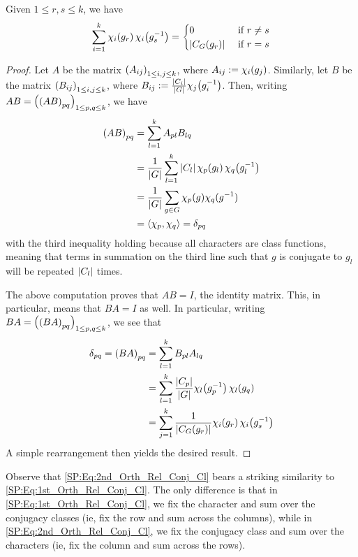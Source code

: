 \begin{boxproposition}\label{SP:2nd_Orth_Rel}
    Given $1 \leq r, s \leq k$, we have
    \begin{align*}
        \sum_{i=1}^{k} \chi_{i}\!\left( g_r \right) \chi_{i}\!\left( g_s^{-1} \right) =
        \begin{cases}
            0 &\text{ if } r \neq s \\
            \left\lvert C_G(g_r) \right\rvert &\text{ if } r = s
        \end{cases}
    \end{align*}
\end{boxproposition}
\begin{proof}
    Let $A$ be the matrix $\left( A_{ij} \right)_{1 \leq i, j \leq k}$, where $A_{ij} := \chi_{i}\!\left( g_j \right)$. Similarly, let $B$ be the matrix $\left( B_{ij} \right)_{1 \leq i, j \leq k}$, where $B_{ij} := \frac{\left\lvert C_i \right\rvert}{\left\lvert G \right\rvert} \chi_{j}\!\left( g_i^{-1} \right)$. Then, writing $AB = \left( \left( AB \right)_{pq} \right)_{1 \leq p, q \leq k}$, we have
    \begin{align*}
        \left( AB \right)_{pq} &=
        \sum_{l=1}^{k} A_{pl} B_{lq} \\
        &= \frac{1}{\left\lvert G \right\rvert} \sum_{l=1}^{k} \left\lvert C_l \right\rvert \chi_{p}\!\left( g_l \right) \chi_{q}\!\left( g_l^{-1} \right) \\
        &= \frac{1}{\left\lvert G \right\rvert} \sum_{g \in G} \chi_p(g) \chi_q(g^{-1}) \\
        &= \left\langle \chi_p, \chi_q \right\rangle = \delta_{pq}
    \end{align*}
    with the third inequality holding because all characters are class functions, meaning that terms in summation on the third line such that $g$ is conjugate to $g_l$ will be repeated $\left\lvert C_l \right\rvert$ times.
    
    The above computation proves that $AB = I$, the identity matrix. This, in particular, means that $BA = I$ as well. In particular, writing $BA = \left( \left( BA \right)_{pq} \right)_{1 \leq p, q \leq k}$, we see that
    \begin{align}
        \delta_{pq} = \left( BA \right)_{pq} &= \sum_{l=1}^{k} B_{pl} A_{lq} \nonumber \\
        &= \sum_{l=1}^{k} \frac{\left\lvert C_p \right\rvert}{\left\lvert G \right\rvert} \chi_{l}\!\left( g_p^{-1} \right) \chi_{l}\!\left( g_q \right) \nonumber \\
        &= \sum_{j=1}^{k} \frac{1}{\left\lvert C_G(g_r) \right\rvert} \chi_{i}\!\left( g_r \right) \chi_{i}\!\left( g_s^{-1} \right)
        \label{SP:Eq:2nd_Orth_Rel_Conj_Cl}
    \end{align}
    A simple rearrangement then yields the desired result.
\end{proof}
\begin{remark}
    Observe that \eqref{SP:Eq:2nd_Orth_Rel_Conj_Cl} bears a striking similarity to \eqref{SP:Eq:1st_Orth_Rel_Conj_Cl}. The only difference is that in \eqref{SP:Eq:1st_Orth_Rel_Conj_Cl}, we fix the character and sum over the conjugacy classes (ie, fix the row and sum across the columns), while in \eqref{SP:Eq:2nd_Orth_Rel_Conj_Cl}, we fix the conjugacy class and sum over the characters (ie, fix the column and sum across the rows).
\end{remark}


